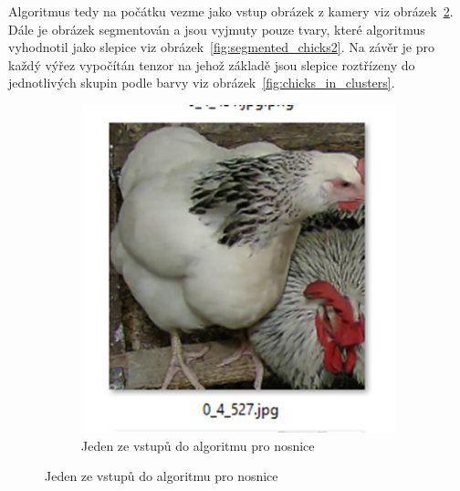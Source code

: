 Algoritmus tedy na počátku vezme jako vstup obrázek z kamery viz obrázek~\ref{fig:source_chick_image}.
Dále je obrázek segmentován a jsou vyjmuty pouze tvary, které algoritmus vyhodnotil jako slepice viz obrázek~\ref{fig:segmented_chicks2}.
Na závěr je pro každý výřez vypočítán tenzor na jehož základě jsou slepice roztřízeny do jednotlivých skupin podle barvy viz obrázek~\ref{fig:chicks_in_clusters}.



\begin{figure}[h]
    \centering
    \begin{subfigure}[t]{1\textwidth}
        \centering
        \includegraphics[width=\textwidth]{img/source_chick_image}
        \caption{Jeden ze vstupů do algoritmu pro nosnice}
        \label{fig:source_chick_image}
    \end{subfigure}


\end{figure}

